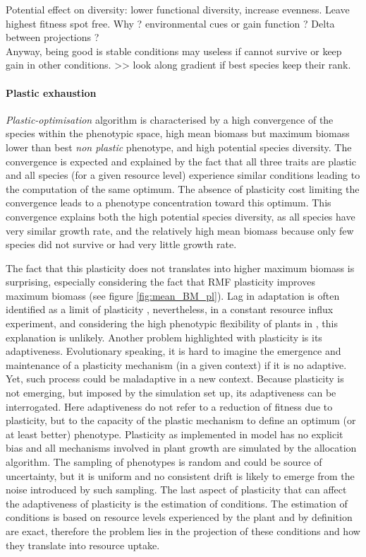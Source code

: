 Potential effect on diversity: lower functional diversity, increase evenness. Leave highest fitness spot free. Why ? environmental cues or gain function ? Delta between projections ? \\

Anyway, being good is stable conditions may useless if cannot survive or keep gain in other conditions. >> look along gradient if best species keep their rank.\\


\paragraph{Plastic exhaustion}

\textit{Plastic-optimisation} algorithm is characterised by a high convergence of the species within the phenotypic space, high mean biomass but maximum biomass lower than best \textit{non plastic} phenotype, and high potential species diversity. The convergence is expected and explained by the fact that all three traits are plastic and all species (for a given resource level) experience similar conditions leading to the computation of the same optimum. The absence of plasticity cost limiting the convergence leads to a phenotype concentration toward this optimum. This convergence explains both the high potential species diversity, as all species have very similar growth rate, and the relatively high mean biomass because only few species did not survive or had very little growth rate.

The fact that this plasticity does not translates into higher maximum biomass is surprising, especially considering the fact that RMF plasticity improves maximum biomass (see figure \ref{fig:mean_BM_pl}). Lag in adaptation is often identified as a limit of plasticity \parencite{dewitt_costs_1998, van_kleunen_constraints_2005}, nevertheless, in a constant resource influx experiment, and considering the high phenotypic flexibility of plants in \model, this explanation is unlikely. Another problem highlighted with plasticity is its adaptiveness. Evolutionary speaking, it is hard to imagine the emergence and maintenance of a plasticity mechanism (in a given context) if it is no adaptive. Yet, such process could be maladaptive in a new context. Because plasticity is not emerging, but imposed by the simulation set up, its adaptiveness can be interrogated. Here adaptiveness do not refer to a reduction of fitness due to plasticity, but to the capacity of the plastic mechanism to define an optimum (or at least better) phenotype. Plasticity as implemented in model has no explicit bias and all mechanisms involved in plant growth are simulated by the allocation algorithm. The sampling of phenotypes is random and could be source of uncertainty, but it is uniform and no consistent drift is likely to emerge from the noise introduced by such sampling. The last aspect of plasticity that can affect the adaptiveness of plasticity is the estimation of conditions. The estimation of conditions is based on resource levels experienced by the plant and by definition are exact, therefore the problem lies in the projection of these conditions and how they translate into resource uptake.


